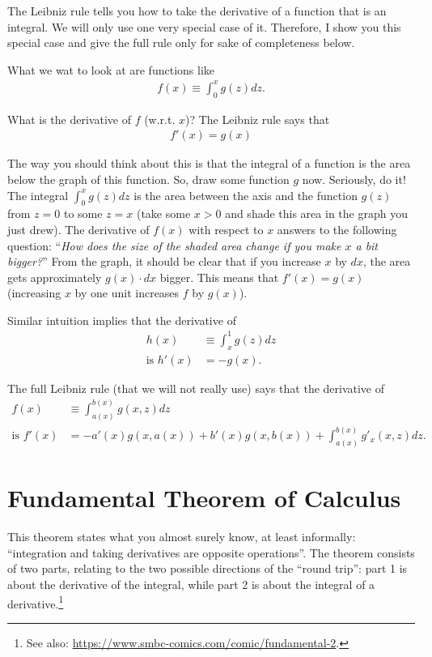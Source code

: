 \documentclass{article}
\begin{document}
The Leibniz rule tells you how to take the derivative of a function that is an integral. We will only use one very special case of it. Therefore, I show you this special case and give the full rule only for sake of completeness below.

What we wat to look at are functions like
\begin{align*}
	f(x) \equiv \int_0^x g(z) dz.
\end{align*}

What is the derivative of $f$ (w.r.t. $x$)? The Leibniz rule says that
\begin{align*}
	f'(x)=g(x)
\end{align*}

The way you should think about this is that the integral of a function is the area below the graph of this function. So, draw some function $g$ now. Seriously, do it! The integral $\int_0^x g(z) dz$ is the area between the axis and the function $g(z)$ from $z=0$ to some $z=x$ (take some $x > 0$ and shade this area in the graph you just drew). The derivative of $f(x)$ with respect to $x$ answers to the following question: ``\emph{How does the size of the shaded area change if you make $x$ a bit bigger?}'' From the graph, it should be clear that if you increase $x$ by $dx$, the area gets approximately $g(x) \cdot dx$ bigger. This means that $f'(x) = g(x)$ (increasing $x$ by one unit increases $f$ by $g(x)$).

Similar intuition implies that the derivative of
\begin{align*}
	h(x) &\equiv \int_x^1 g(z) dz
	\\
	\text{is }
	h'(x) &= -g(x).
\end{align*}

The full Leibniz rule (that we will not really use) says that the derivative of
\begin{align*}
	f(x) &\equiv \int_{a(x)}^{b(x)} g(x,z) dz
	\\
	\text{is } f'(x) &= -a'(x)g(x,a(x)) + b'(x) g(x,b(x)) + \int_{a(x)}^{b(x)} g'_x(x,z) dz.
\end{align*}



\section{Fundamental Theorem of Calculus}

This theorem states what you almost surely know, at least informally: ``integration and taking derivatives are opposite operations''. The theorem consists of two parts, relating to the two possible directions of the ``round trip'': part 1 is about the derivative of the integral, while part 2 is about the integral of a derivative.\footnote{See also: \url{https://www.smbc-comics.com/comic/fundamental-2}.}
\end{document}
